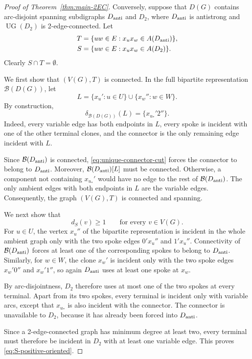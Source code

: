 \documentclass[12pt]{article}
\theoremstyle{remark}
\newcommand{\UG}{\operatorname{UG}}
\newcommand{\cB}{\mathcal{B}}
\begin{document}
\begin{proof}[Proof of Theorem~\ref{thm:main-2EC}]
Conversely, suppose that $D(G)$ contains arc-disjoint spanning
subdigraphs $D_{\rm anti}$ and $D_2$, where $D_{\rm anti}$ is
antistrong and $\UG(D_2)$ is 2-edge-connected.  Let
\begin{align*}
 T&=\{uw\in E:x_ux_w\in A(D_{\rm anti})\},\\
 S&=\{uw\in E:x_ux_w\in A(D_2)\}.
\end{align*}
Clearly $S\cap T=\emptyset$.

We first show that $(V(G),T)$ is connected. In the full bipartite representation $\cB(D(G))$, let
\[
   L=\{x_u':u\in U\}\cup\{x_w'':w\in W\}.
\]
By construction,
\begin{equation}\label{eq:unique-connector-cut}
   \delta_{\cB(D(G))}(L)=\{x_{u_*}'2''\}.
\end{equation}
Indeed, every variable edge has both endpoints in $L$, every spoke is incident with one of the other terminal clones, and the connector is the only remaining edge incident with $L$.

Since $\cB(D_{\rm anti})$ is connected,
\eqref{eq:unique-connector-cut} forces the connector to belong to $D_{\rm anti}$.  Moreover, $\cB(D_{\rm anti})[L]$ must be connected.  Otherwise, a component not containing $x_{u_*}'$ would
have no edge to the rest of $\cB(D_{\rm anti})$. The only ambient edges with both endpoints in $L$ are the variable edges. Consequently, the graph $(V(G),T)$ is connected and spanning.

We next show that
\begin{equation}\label{eq:S-positive-oriented}
   d_S(v)\ge 1\qquad\text{for every }v\in V(G).
\end{equation}
For $u\in U$, the vertex $x_u''$ of the bipartite representation is
incident in the whole ambient graph only with the two spoke edges $0'x_u''$ and $1'x_u''$.  Connectivity of $\cB(D_{\rm anti})$ forces at least one of the corresponding spokes to
belong to $D_{\rm anti}$.  Similarly, for $w\in W$, the clone $x_w'$ is incident only with the two spoke edges $x_w'0''$ and $x_w'1''$, so again $D_{\rm anti}$ uses at least one spoke at $x_w$.

By arc-disjointness, $D_2$ therefore uses at most one of the two spokes at every terminal. Apart from its two spokes, every terminal is incident only with variable arcs, except that $x_{u_*}$ is also incident with the connector. The connector is unavailable to $D_2$, because it has already been forced into $D_{\rm anti}$.

Since a 2-edge-connected graph has minimum degree at least two, every terminal must therefore be incident in $D_2$ with at least one variable edge. This proves
\eqref{eq:S-positive-oriented}.


\end{proof}
\end{document}
